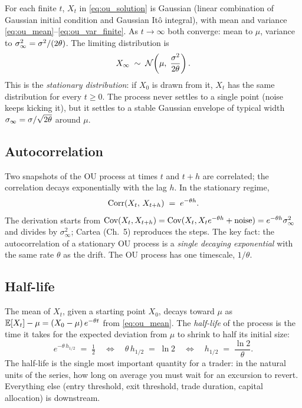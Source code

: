 For each finite $t$, $X_t$ in \eqref{eq:ou_solution} is Gaussian
(linear combination of Gaussian initial condition and Gaussian
It\^o integral), with mean and variance
\eqref{eq:ou_mean}--\eqref{eq:ou_var_finite}. As $t \to \infty$
both converge: mean to $\mu$, variance to
$\sigma_\infty^2 = \sigma^2/(2\theta)$. The limiting distribution
is
\begin{equation}
  X_\infty \;\sim\; \mathcal{N}\!\left(\mu,\;\frac{\sigma^2}{2\theta}\right).
  \label{eq:ou_stationary_dist}
\end{equation}
This is the \emph{stationary distribution}: if $X_0$ is drawn
from it, $X_t$ has the same distribution for every $t \geq 0$.
The process never settles to a single point (noise keeps
kicking it), but it settles to a stable Gaussian envelope of
typical width $\sigma_\infty = \sigma/\sqrt{2\theta}$ around
$\mu$.

\subsection{Autocorrelation}
\label{subsec:ch9_autocorr}

Two snapshots of the OU process at times $t$ and $t + h$ are
correlated; the correlation decays exponentially with the lag
$h$. In the stationary regime,
\begin{equation}
  \operatorname{Corr}(X_t,\, X_{t+h}) \;=\; e^{-\theta h}.
  \label{eq:ou_autocorr}
\end{equation}
The derivation starts from $\operatorname{Cov}(X_t, X_{t+h}) =
\operatorname{Cov}(X_t, X_t e^{-\theta h} + \text{noise}) = e^{-\theta h}
\sigma_\infty^2$ and divides by $\sigma_\infty^2$; Cartea
\citeCartea{} (Ch.~5) reproduces the steps. The key fact: the
autocorrelation of a stationary OU process is a \emph{single
decaying exponential} with the same rate $\theta$ as the drift.
The OU process has one timescale, $1/\theta$.

\subsection{Half-life}
\label{subsec:ch9_halflife}

The mean of $X_t$, given a starting point $X_0$, decays toward
$\mu$ as $\mathbb{E}[X_t] - \mu = (X_0 - \mu)\,e^{-\theta t}$ from
\eqref{eq:ou_mean}. The \emph{half-life} of the process is the
time it takes for the expected deviation from $\mu$ to shrink to
half its initial size:
\begin{equation}
  e^{-\theta\,h_{1/2}} \;=\; \tfrac{1}{2}
  \quad\Longleftrightarrow\quad
  \theta\,h_{1/2} \;=\; \ln 2
  \quad\Longleftrightarrow\quad
  h_{1/2} \;=\; \frac{\ln 2}{\theta}.
  \label{eq:ou_halflife}
\end{equation}
The half-life is the single most important quantity for a
trader: in the natural units of the series, how long on average
you must wait for an excursion to revert. Everything else
(entry threshold, exit threshold, trade duration, capital
allocation) is downstream.

